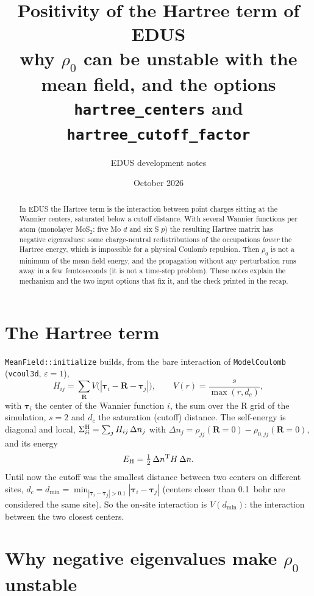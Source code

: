 \documentclass[11pt]{article}
\title{Positivity of the Hartree term of EDUS\\[2pt]
\large why $\rho_0$ can be unstable with the mean field, and the options \texttt{hartree\_centers} and \texttt{hartree\_cutoff\_factor}}
\author{EDUS development notes}
\date{October 2026}
\newcommand{\Dn}{\Delta n}
\begin{document}
\maketitle

\begin{abstract}
In EDUS the Hartree term is the interaction between point charges sitting at the Wannier centers, saturated below a
cutoff distance. With several Wannier functions per atom (monolayer MoS$_2$: five Mo $d$ and six S $p$) the resulting
Hartree matrix has negative eigenvalues: some charge-neutral redistributions of the occupations \emph{lower} the
Hartree energy, which is impossible for a physical Coulomb repulsion. Then $\rho_0$ is not a minimum of the
mean-field energy, and the propagation without any perturbation runs away in a few femtoseconds (it is not a
time-step problem). These notes explain the mechanism and the two input options that fix it, and the check printed in
the recap.
\end{abstract}

\section{The Hartree term}

\texttt{MeanField::initialize} builds, from the bare interaction of \texttt{ModelCoulomb} (\texttt{vcoul3d}, $\varepsilon=1$),
\begin{equation}
H_{ij} = \sum_{\mathbf R} V\big(|\boldsymbol\tau_i - \mathbf R - \boldsymbol\tau_j|\big),
\qquad
V(r) = \frac{s}{\max(r, d_c)},
\label{eq:H}
\end{equation}
with $\boldsymbol\tau_i$ the center of the Wannier function $i$, the sum over the R grid of the simulation, $s=2$ and
$d_c$ the saturation (cutoff) distance. The self-energy is diagonal and local,
$\Sigma^{\rm H}_{ii} = \sum_j H_{ij}\,\Dn_j$ with $\Dn_j = \rho_{jj}(\mathbf R=0) - \rho_{0,jj}(\mathbf R=0)$, and its energy
\begin{equation}
E_{\rm H} = \tfrac12\,\Dn^{\rm T} H\,\Dn .
\label{eq:EH}
\end{equation}
Until now the cutoff was the smallest distance between two centers on different sites,
$d_c = d_{\min} = \min_{|\boldsymbol\tau_i-\boldsymbol\tau_j|>0.1}|\boldsymbol\tau_i-\boldsymbol\tau_j|$
(centers closer than 0.1~bohr are considered the same site). So the on-site interaction is $V(d_{\min})$: the
interaction between the two closest centers.

\section{Why negative eigenvalues make $\rho_0$ unstable}
\end{document}
